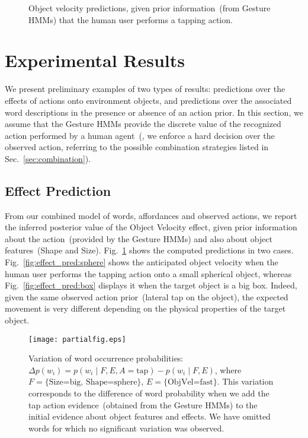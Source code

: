 
\begin{figure}
    \centering
     \quad
    \caption{Object velocity predictions, given prior information~(from Gesture \acp{HMM}) that the human user performs a tapping action.}
    \label{fig:effect_pred}
\end{figure}

\section{Experimental Results}

We present preliminary examples of two types of results: predictions over the effects of actions onto environment objects, and predictions over the associated word descriptions in the presence or absence of an action prior. In this section, we assume that the Gesture \acp{HMM} provide the discrete value of the recognized action performed by a human agent~(\ie, we enforce a hard decision over the observed action, referring to the possible combination strategies listed in Sec.~\ref{sec:combination}).

\subsection{Effect Prediction}

From our combined model of words, affordances and observed actions, we report the inferred posterior value of the Object Velocity effect, given prior information about the action~(provided by the Gesture \acp{HMM}) and also about object features~(Shape and Size). Fig.~\ref{fig:effect_pred} shows the computed predictions in two cases. Fig.~\ref{fig:effect_pred:sphere} shows the anticipated object velocity when the human user performs the tapping action onto a small spherical object, whereas Fig.~\ref{fig:effect_pred:box} displays it when the target object is a big box. Indeed, given the same observed action prior~(lateral tap on the object), the expected movement is very different depending on the physical properties of the target object.

\begin{figure}
\centering
\texttt{[image: partialfig.eps]}
\caption{Variation of word occurrence probabilities: $\Delta p(w_i) = p(w_i \mid F, E, A=\text{tap}) - p(w_i \mid F,E)$, where $F = \{\text{Size=big, Shape=sphere}\}$, $E = \{\text{ObjVel=fast}\}$. This variation corresponds to the difference of word probability when we add the tap action evidence~(obtained from the Gesture \acp{HMM}) to the initial evidence about object features and effects. We have omitted words for which no significant variation was observed.}
\label{fig:probdiff}
\end{figure}

